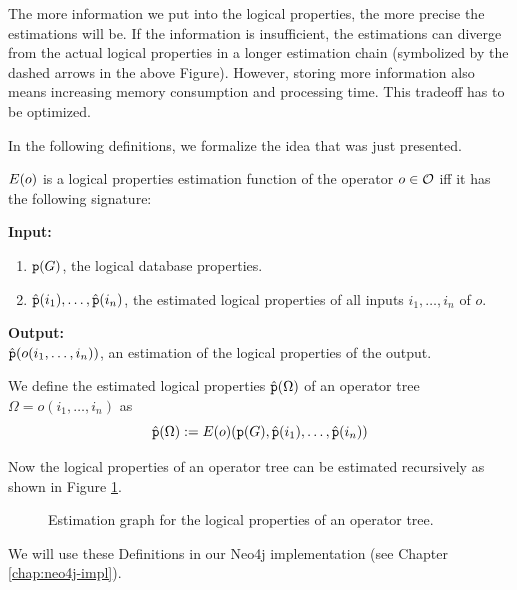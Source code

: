 The more information we put into the logical properties, the more precise the
estimations will be. If the information is insufficient, the estimations can
diverge from the actual logical properties in a longer estimation chain
(symbolized by the dashed arrows in the above Figure).
However, storing more information also means increasing
memory consumption and processing time. This tradeoff has to be optimized.

In the following definitions, we formalize the idea that was just presented.

\begin{definition}
  $E(o)$ is a logical properties estimation function of the operator
  $o \in \mathcal{O}$ iff it has the following signature:\\
  
  \begin{samepage}
  \textbf{Input:}
  \begin{enumerate}
    \item $\texttt{p}(G)$, the logical database properties.
    \item $\hat{\texttt{p}}(i_1), \ldots, \hat{\texttt{p}}(i_n)$,
      the estimated logical properties of all inputs $i_1, \ldots, i_n$ of $o$.
  \end{enumerate}
  
  \textbf{Output:}\\
  
  $\hat{\texttt{p}}(o(i_1, \ldots, i_n))$, an estimation of the logical properties of the
  output.
  \end{samepage}
\end{definition}

\begin{definition}
  We define the estimated logical properties $\hat{\texttt{p}}(\Omega)$ of an
  operator tree $\Omega = o(i_1, \ldots, i_n)$ as
  \begin{displaymath}
    \hat{\texttt{p}}(\Omega)
      := E(o)(\texttt{p}(G), \hat{\texttt{p}}(i_1), \ldots, \hat{\texttt{p}}(i_n))
  \end{displaymath}
\end{definition}

Now the logical properties of an operator tree can be estimated recursively as
shown in Figure \ref{fig:estimation-tree}.

\begin{figure}[ht]
 \begin{center}
   
 \end{center}
 \caption{Estimation graph for the logical properties of an operator tree.}
 \label{fig:estimation-tree}
\end{figure}

We will use these Definitions in our Neo4j implementation
(see Chapter \ref{chap:neo4j-impl}).
